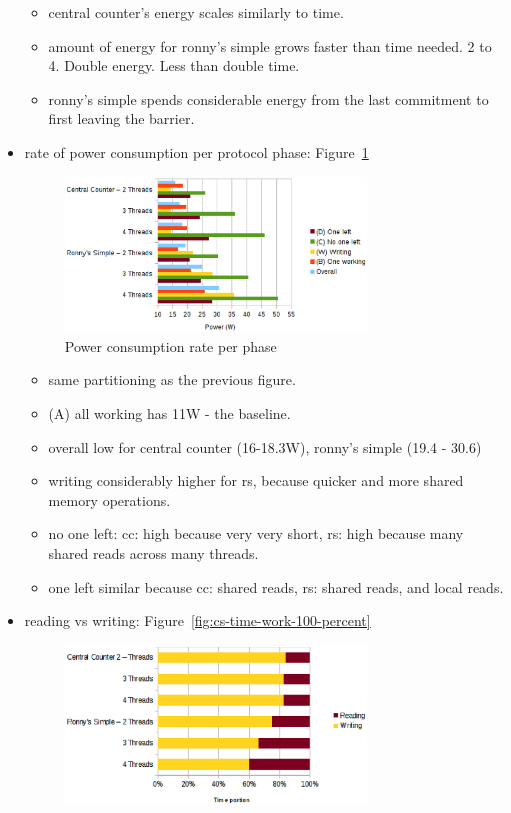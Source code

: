 \documentclass[a4paper, 10pt]{article}
\begin{document}
\begin{itemize}
\begin{itemize}
			\item central counter's energy scales similarly to time.
			\item amount of energy for ronny's simple grows faster than time needed. 2 to 4. Double energy. Less than double time.
			\item ronny's simple spends considerable energy from the last commitment to first leaving the barrier.
		\end{itemize}
	\item rate of power consumption per protocol phase: Figure~\ref{fig:cs-power-work-100}
		\begin{figure}[htbp]
			\centering
			\includegraphics[width=8cm]{charts/cs-power-work-100}
			\caption{Power consumption rate per phase}
			\label{fig:cs-power-work-100}
		\end{figure}
		\begin{itemize}
			\item same partitioning as the previous figure.
			\item (A) all working has 11W - the baseline.
			\item overall low for central counter (16-18.3W), ronny's simple (19.4 - 30.6)
			\item writing considerably higher for rs, because quicker and more shared memory operations.
			\item no one left: cc: high because very very short, rs: high because many shared reads across many threads.
			\item one left similar because cc: shared reads, rs: shared reads, and local reads.
		\end{itemize}
	\item reading vs writing: Figure~\ref{fig:cs-time-work-100-percent}
		\begin{figure}[htbp]
			\centering
			\includegraphics[width=8cm]{charts/cs-time-work-100-percent}

\end{figure}
\end{itemize}
\end{document}
